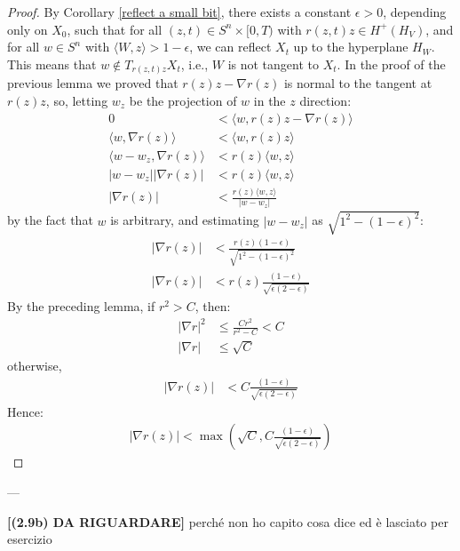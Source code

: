 \begin{proof}
	By Corollary \ref{reflect a small bit}, there exists a constant $ \epsilon > 0 $, depending only on $ X_0 $, such that for all $ (z, t) \in S^n \times [0, T) $ with $ r(z, t) z \in H^+(H_V) $, and for all $ w \in S^n $ with $ \langle W, z \rangle > 1 - \epsilon $, we can reflect $ X_t $ up to the hyperplane $ H_W $. This means that $ w \notin T_{r(z,t) z} X_t $, i.e., $ W $ is not tangent to $ X_t $. In the proof of the previous lemma we proved that $r(z) z - \nabla r(z)$ is normal to the tangent at $r(z) z$, so, letting $w_z$ be the projection of $w$ in the $z$ direction: 
	\begin{align*}
		0&< \langle w, r(z) z - \nabla r(z)  \rangle\\
		\langle w,  \nabla r(z)  \rangle &< \langle w, r(z) z   \rangle\\
		\langle w - w_z,  \nabla r(z)  \rangle &< r(z) \langle w,  z   \rangle\\
		|w - w_z||\nabla r(z)|  &<  r(z) \langle w,  z   \rangle\\
		|\nabla r(z)| &<  \frac{r(z) \langle w,  z   \rangle}{|w - w_z|}
	\end{align*}
	by the fact that $w$ is arbitrary, and estimating $|w - w_z|$ as $\sqrt{1^2 - (1-\epsilon)^2}$:
	\begin{align*}
		|\nabla r(z)|  &<\frac{r(z) (1-\epsilon)}{\sqrt{1^2 - (1-\epsilon)^2}}\\
		|\nabla r(z)|  &<r(z)\frac{ (1-\epsilon)}{\sqrt{\epsilon (2-\epsilon)}}
	\end{align*}
	By the preceding lemma, if $ r^2 > C $, then:
	\begin{align*}
		|\nabla r|^2 &\leq \frac{C r^2}{r^2 - C} < C\\
		|\nabla r| &\leq \sqrt{C}
	\end{align*}
	otherwise, 
	\begin{align*}
		|\nabla r(z)|  &<C\frac{ (1-\epsilon)}{\sqrt{\epsilon (2-\epsilon)}}
	\end{align*}
	Hence:
	\begin{align*}
		|\nabla r(z)| < \max\left(\sqrt{C}, C\frac{ (1-\epsilon)}{\sqrt{\epsilon (2-\epsilon)}}\right)
	\end{align*} 
\end{proof}
---

{\LARGE \textbf{[(2.9b) DA RIGUARDARE]}} perché non ho capito cosa dice ed è lasciato per esercizio
